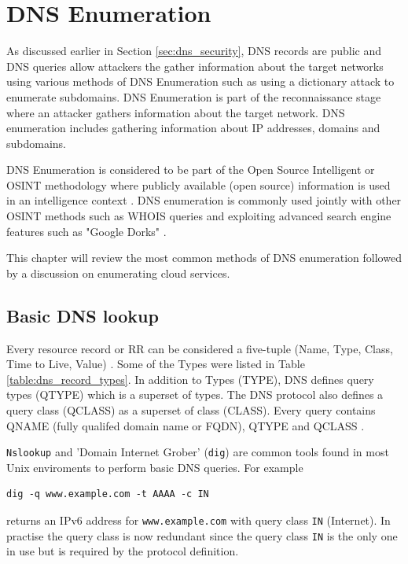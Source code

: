 \section{DNS Enumeration}

As discussed earlier in Section \ref{sec:dns_security}, DNS records are public and DNS queries allow attackers the gather information about the target networks using various methods of DNS Enumeration such as using a dictionary attack to enumerate subdomains. DNS Enumeration is part of the reconnaissance stage where an attacker gathers information about the target network. DNS enumeration includes gathering information about IP addresses, domains and subdomains.

DNS Enumeration is considered to be part of the Open Source Intelligent or OSINT methodology where publicly available (open source) information is used in an intelligence context \cite{network_sec_assessment}. DNS enumeration is commonly used jointly with other OSINT methods such as WHOIS queries and exploiting advanced search engine features such as "Google Dorks" \cite{network_sec_assessment}.

This chapter will review the most common methods of DNS enumeration followed by a discussion on enumerating cloud services.

\subsection{Basic DNS lookup}

Every resource record or RR can be considered a five-tuple (Name, Type, Class, Time to Live, Value) \cite{RFC1035}. Some of the Types were listed in Table \ref{table:dns_record_types}. In addition to Types (TYPE), DNS defines query types (QTYPE) which is a superset of types. The DNS protocol also defines a query class (QCLASS) as a superset of class (CLASS). Every query contains QNAME (fully qualifed domain name or FQDN), QTYPE and QCLASS \cite{RFC1035}.

\texttt{Nslookup} and 'Domain Internet Grober' (\texttt{dig}) are common tools found in most Unix enviroments to perform basic DNS queries. For example
\begin{verbatim}
dig -q www.example.com -t AAAA -c IN
\end{verbatim}
returns an IPv6 address for \texttt{www.example.com} with query class \texttt{IN} (Internet). In practise the query class is now redundant since the query class \texttt{IN} is the only one in use but is required by the protocol definition.

